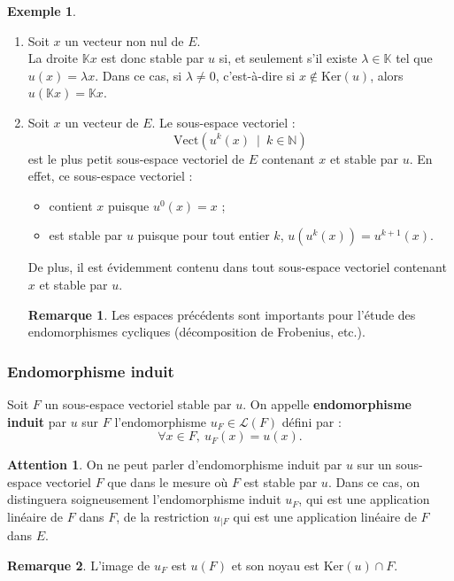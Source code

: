 \documentclass[french]{article}
\newcommand{\N}{\mathbb{N}}
\newcommand{\K}{\mathbb{K}}
\renewcommand{\ker}{\text{Ker}}
\newcommand{\Vect}{\text{Vect}}
\theoremstyle{plain}
\theoremstyle{definition}
\newtheorem*{ex}{Exemple}
\newtheorem*{rmq}{Remarque}
\newtheorem*{attention}{Attention}
\theoremstyle{remark}
\begin{document}
\begin{ex}
	\begin{enumerate}
		\item Soit $x$ un vecteur non nul de $E$. \\
		La droite $\K x$ est donc stable par $u$ si, et seulement s'il existe $\lambda\in \K$ tel que $u(x)=\lambda x$. Dans ce cas, si $\lambda\ne 0$, c'est-à-dire si $x\notin\ker(u)$, alors $u(\K x)=\K x$.
		\item Soit $x$ un vecteur de $E$. Le sous-espace vectoriel : $$\Vect\left(u^k(x)\ \mid\ k\in\N\right)$$ est le plus petit sous-espace vectoriel de $E$ contenant $x$ et stable par $u$. En effet, ce sous-espace vectoriel :
		\begin{itemize}
			\item contient $x$ puisque $u^0(x)=x$ ;
			\item est stable par $u$ puisque pour tout entier $k$, $u(u^k(x))=u^{k+1}(x)$.
		\end{itemize}
		De plus, il est évidemment contenu dans tout sous-espace vectoriel contenant $x$ et stable par $u$.
		\begin{rmq}
			Les espaces précédents sont importants pour l'étude des endomorphismes cycliques (décomposition de Frobenius, etc.).
		\end{rmq}
	\end{enumerate}
\end{ex}

\subsubsection*{Endomorphisme induit}

\begin{dfn}
	Soit $F$ un sous-espace vectoriel stable par $u$. On appelle \textbf{endomorphisme induit} par $u$ sur $F$ l'endomorphisme $u_F\in\mathcal{L}(F)$ défini par : $$\forall x\in F,\ u_F(x)=u(x).$$
\end{dfn}

\begin{attention}
	On ne peut parler d'endomorphisme induit par $u$ sur un sous-espace vectoriel $F$ que dans le mesure où $F$ est stable par $u$. Dans ce cas, on distinguera soigneusement l'endomorphisme induit $u_F$, qui est une application linéaire de $F$ dans $F$, de la restriction $u_{\mid F}$ qui est une application linéaire de $F$ dans $E$.
\end{attention}

\begin{rmq}
	L'image de $u_F$ est $u(F)$ et son noyau est $\ker(u)\cap F$.
\end{rmq}
\end{document}

